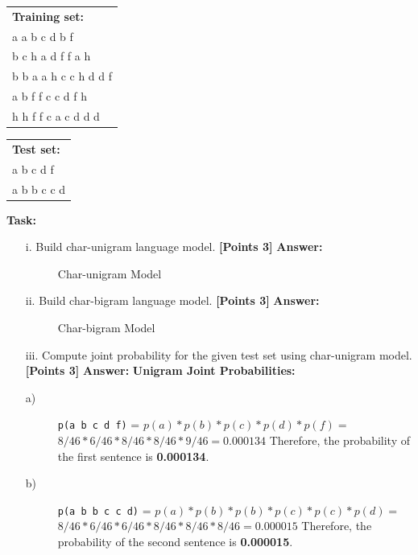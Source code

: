 \documentclass[12pt]{article}
\newcommand\n{\newline}
\begin{document}
\begin{enumerate}
          \begin{tabular}{l}
              \textbf{Training set:} \\
              a a b c d b f          \\
              b c h a d f f a h      \\
              b b a a h c c h d d f  \\
              a b f f c c d f h      \\
              h h f f c a c d d d    \\
          \end{tabular}

          \begin{tabular}{l}
              \textbf{Test set:} \\
              a b c d f          \\
              a b b c c d        \\
          \end{tabular}

          \textbf{Task:}
          \begin{enumerate}
              \item[i.] Build char-unigram language model. \textbf{[Points 3]}
                  \n\textbf{Answer:}
                  \begin{figure}[h]
                      \centering
                      
                      \caption{Char-unigram Model}
                  \end{figure}
                  \newpage
              \item[ii.] Build char-bigram language model. \textbf{[Points 3]}
                  \n\textbf{Answer:}
                  \begin{figure}[h]
                      \centering
                      
                      \caption{Char-bigram Model}
                  \end{figure}
                  \newpage
              \item[iii.] Compute joint probability for the given test set using
                  char-unigram model. \n\textbf{[Points 3]}
                  \n\textbf{Answer:}\n
                  \textbf{Unigram Joint Probabilities:}
                  \begin{description}
                      \item[a)] \verb/p(a b c d f)/ = \n
                          $p(a)*p(b)*p(c)*p(d)*p(f) =$ \n
                          $8/46*6/46*8/46*8/46*9/46 = 0.000134$\n\n
                          Therefore, the probability of the first sentence is \textbf{0.000134}.
                      \item[b)] \verb/p(a b b c c d)/ = \n
                          $p(a)*p(b)*p(b)*p(c)*p(c)*p(d) =$ \n
                          $8/46*6/46*6/46*8/46*8/46*8/46 = 0.000015$\n\n
                          Therefore, the probability of the second sentence is \textbf{0.000015}.
                  \end{description}


\end{enumerate}
\end{enumerate}
\end{document}
